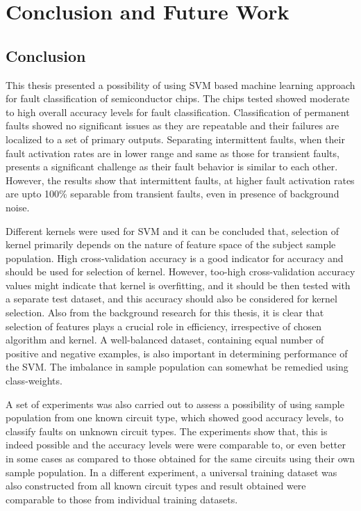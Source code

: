 \chapter{Conclusion and Future Work}
\label{chap:chapter7}
\section{Conclusion}

This thesis presented a possibility of using SVM based machine learning approach for fault classification of semiconductor chips. The chips tested showed moderate to high overall accuracy levels for fault classification. Classification of permanent faults showed no significant issues as they are repeatable and their failures are localized to a set of primary outputs. Separating intermittent faults, when their fault activation rates are in lower range and same as those for transient faults, presents a significant challenge as their fault behavior is similar to each other. However, the results show that intermittent faults, at higher fault activation rates are upto 100\% separable from transient faults, even in presence of background noise.


Different kernels were used for SVM and it can be concluded that, selection of kernel primarily depends on the nature of feature space of the subject sample population. High cross-validation accuracy is a good indicator for accuracy and should be used for selection of kernel. However, too-high cross-validation accuracy values might indicate that kernel is overfitting, and it should be then tested with a separate test dataset, and this accuracy should also be considered for kernel selection. Also from the background research for this thesis, it is clear that selection of features plays a crucial role in efficiency, irrespective of chosen algorithm and kernel. A well-balanced dataset, containing equal number of positive and negative examples, is also important in determining performance of the SVM. The imbalance in sample population can somewhat be remedied using class-weights.

A set of experiments was also carried out to assess a possibility of using sample population from one known circuit type, which showed good accuracy levels, to classify faults on unknown circuit types. The experiments show that, this is indeed possible and the accuracy levels were were comparable to, or even better in some cases as compared to those obtained for the same circuits using their own sample population. In a different experiment,  a universal training dataset was also constructed from all known circuit types and result obtained were comparable to those from individual training datasets.

